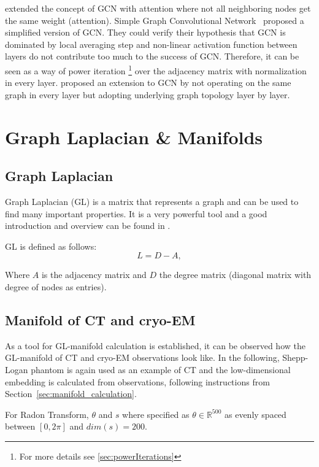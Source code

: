 \citet{GAT} extended the concept of GCN with attention where not all neighboring nodes get the same weight (attention).
Simple Graph Convolutional Network~\cite{simpleGCN} proposed a simplified version of GCN.
They could verify their hypothesis that GCN is dominated by local averaging step and non-linear 
activation function between layers do not contribute too much to the success of GCN. 
Therefore, it can be seen as a way of power iteration \footnote{For more details see \ref{sec:powerIterations}}
over the adjacency matrix with normalization in every layer.
\citet{dynamicGCN} proposed an extension to GCN by not operating on the same graph in every layer but adopting
underlying graph topology layer by layer.

\section{Graph Laplacian \& Manifolds}
\subsection{Graph Laplacian}
Graph Laplacian (GL) is a matrix that represents a graph and can be used to find many important properties.
It is a very powerful tool and a good introduction and overview can be found in \cite{tutorialSpectralClustering, SpectralGraphTheory}. 

GL is defined as follows:
\begin{equation}
    \label{eq:gl}
    L = D - A,
\end{equation}

Where $A$ is the adjacency matrix and $D$ the degree matrix (diagonal matrix with degree of nodes as entries).


\subsection{Manifold of CT and cryo-EM}
\label{sec:manifold_ct_cryoEM}
As a tool for GL-manifold calculation is established, it can be observed how the GL-manifold of CT and cryo-EM observations look like.
In the following, Shepp-Logan phantom is again used as an example of CT
and the low-dimensional embedding is calculated from observations, following instructions from 
Section~\ref{sec:manifold_calculation}.

For Radon Transform, $\theta$ and $s$ where specified as $\theta \in \mathbb{R}^{500}$ as evenly spaced
between $[0, 2 \pi]$ and $dim(s) = 200$. 

